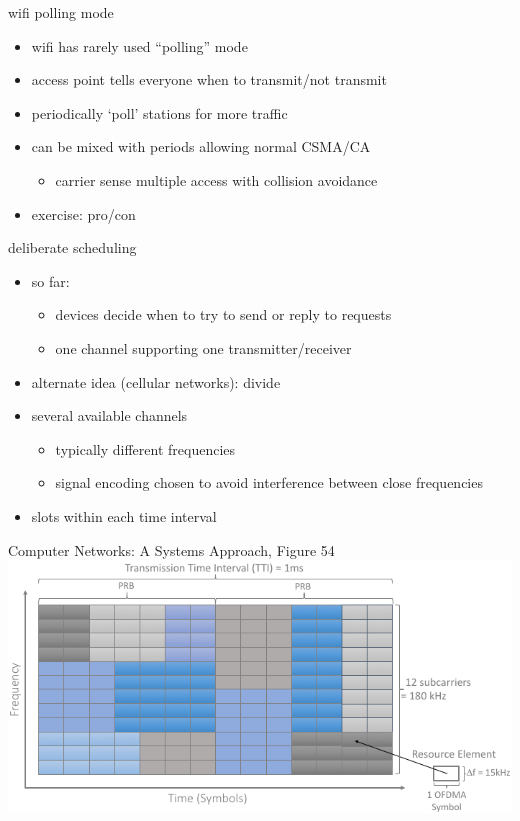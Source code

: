 \begin{frame}{wifi polling mode}
    \begin{itemize}
    \item wifi has rarely used ``polling'' mode
    \vspace{.5cm}
    \item access point tells everyone when to transmit/not transmit
    \item periodically `poll' stations for more traffic
    \item can be mixed with periods allowing normal CSMA/CA
        \begin{itemize}
        \item carrier sense multiple access with collision avoidance
        \end{itemize}
    \vspace{.5cm}
    \item exercise: pro/con
    \end{itemize}
\end{frame}

\begin{frame}{deliberate scheduling}
\begin{itemize}
\item so far: 
    \begin{itemize}
    \item devices decide when to try to send or reply to requests
    \item one channel supporting one transmitter/receiver
    \end{itemize}
\vspace{.5cm}
\item alternate idea (cellular networks): divide
\item several available channels
    \begin{itemize}
    \item typically different frequencies
    \item signal encoding chosen to avoid interference between close frequencies
    \end{itemize}
\item slots within each time interval
\end{itemize}
\end{frame}

\begin{frame}

{\fontsize{9}{10}\selectfont Computer Networks: A Systems Approach, Figure 54}
\includegraphics[width=\textwidth]{../multiaccess/CNSA-Fig54}
\end{frame}

